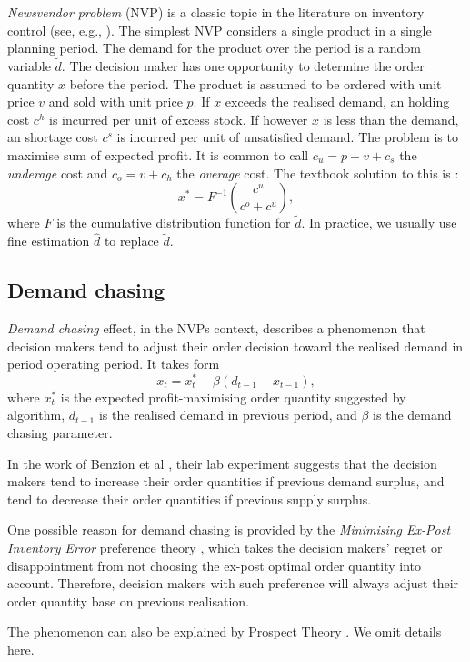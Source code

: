 \documentclass[a4paper,11pt]{article}
\begin{document}
\emph{Newsvendor problem} (NVP) is a classic topic in the literature on inventory control (see, e.g., \cite{Ch12,HW63}). The simplest NVP considers a single product in a single planning period. The demand for the product over the period is a random variable $\tilde d$. The decision maker has one opportunity to determine the order quantity $x$ before the period. The product is assumed to be ordered with unit price $v$ and sold with unit price $p$. If $x$ exceeds the realised demand, an holding cost $c^h$ is incurred per unit of excess stock. If however $x$ is less than the demand, an shortage cost $c^s$ is incurred per unit of unsatisfied demand. The problem is to maximise sum of expected profit. It is common to call $c_u = p-v+c_s$ the \emph{underage} cost and $c_o = v+c_h$ the \emph{overage} cost. The textbook solution to this is \cite{Ch12}:
\[
    x^* = F^{-1}\left( \frac{c^u}{c^o+c^u} \right),
\]
where $F$ is the cumulative distribution function for $\tilde d$. In practice, we usually use fine estimation $\hat{d}$ to replace $\tilde{d}$.

\subsection{Demand chasing}
\label{sub:lit2}

\emph{Demand chasing} effect, in the NVPs context, describes a phenomenon that decision makers tend to adjust their order decision toward the realised demand in period operating period. It takes form
\[
    x_t = x_t^* + \beta (d_{t-1}-x_{t-1}),
\]
where $x_t^*$ is the expected profit-maximising order quantity suggested by algorithm, $d_{t-1}$ is the realised demand in previous period, and $\beta$ is the demand chasing parameter.

In the work of Benzion et al \cite{BCPS08}, their lab experiment suggests that the decision makers tend to increase their order quantities if previous demand surplus, and tend to decrease their order quantities if previous supply surplus. 

One possible reason for demand chasing is provided by the \emph{Minimising Ex-Post Inventory Error} preference theory \cite{SC00}, which takes the decision makers' regret or disappointment from not choosing the ex-post optimal order quantity into account. Therefore, decision makers with such preference will always adjust their order quantity base on previous realisation. 

The phenomenon can also be explained by Prospect Theory \cite{KT79}. We omit details here.
\end{document}
